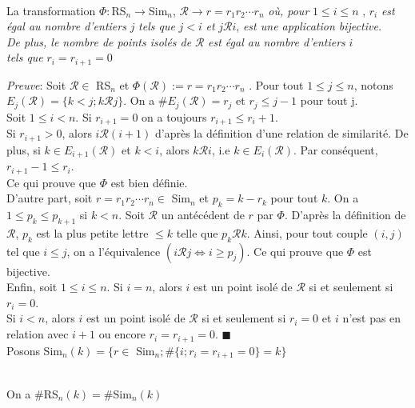\begin{proposition} \label{Phi_bijection} \text{ }\\
	La transformation $\Phi: $\rm{RS}$_{n} \rightarrow $\rm{Sim}$_{n}$, $\mathcal{R} \rightarrow r = r_{1}r_{2}\cdots r_{n}$ \textit{ où, pour }$1\leq i \leq n$ , $r_{i}$ \textit{est égal au nombre d'entiers} $j$ \textit{tels que} $j<i$ \textit{et} $j\mathcal{R}i$, \textit{est une application bijective.}\\ \textit{De plus, le nombre de points isolés de} $\mathcal{R}$ \textit{est égal au nombre d'entiers} $i$ \\\textit{tels que} $r_{i}=r_{i+1}=0$ %
\end{proposition}
\textit{Preuve}:
Soit $\mathcal{R} \in $\rm{ RS}$_{n}$ et $\Phi(\mathcal{R}):= r = r_{1}r_{2}\cdots r_{n}$ . Pour tout $1\leq j \leq n$, notons $E_{j}(\mathcal{R})=\{k<j; k \mathcal{R} j \}$. On a $\# E_{j}(\mathcal{R})=r_{j}$ et $r_{j}\leq j-1$ pour tout j.\\ Soit $1\leq i < n$. Si $r_{i+1}=0$ on a toujours $r_{i+1}\leq r_{i}+1$.\\
Si $r_{i+1}>0$, alors $i\mathcal{R}(i+1)$ d'après la définition d'une relation de similarité. De plus, si $k\in E_{i+1}(\mathcal{R})$ et $k<i$, alors $k\mathcal{R}i$, i.e $k\in E_{i}(\mathcal{R})$. Par conséquent, $r_{i+1}-1 \leq r_{i}$. \\Ce qui prouve que $\Phi$ est bien définie.\vspace{5pt}\\
D'autre part, soit $r=r_{1}r_{2}\cdots r_{n}\in $\rm{ Sim}$_{n}$ et $p_{k}=k-r_{k}$ pour tout $k$. On a $1\leq p_{k}\leq p_{k+1}$ si $k<n$.
Soit $\mathcal{R}$ un antécédent de $r$ par $\Phi$. D'après la définition de $\mathcal{R}$, $p_{k}$ est la plus petite lettre $\leq k$ telle que $p_{k}\mathcal{R}k$. Ainsi, pour tout couple $(i, j)$ tel que $i\leq j$, on a l'équivalence $(i\mathcal{R}j \iff i \geq p_{j})$. Ce qui prouve que $\Phi$ est bijective.\vspace{10pt}\\
Enfin, soit $1\leq i \leq n$. Si $i=n$, alors $i$ est un point isolé de $\mathcal{R}$ si et seulement si $r_{i}=0$.\\
Si $i<n$, alors $i$ est un point isolé de $\mathcal{R}$ si et seulement si $r_{i}=0$ et $i$ n'est pas en relation avec $i+1$ ou encore $r_{i}=r_{i+1}=0$. $\blacksquare$\\
Posons Sim$_{n}(k)=\{r \in $ Sim$_{n}; \#\{i; r_{i}=r_{i+1}=0\}=k\}$ 
\begin{corollaire} \label{sr_eq_sim} \text{ }\\
	On a $\#$\rm{RS}$_{n}(k) = \#$\rm{Sim}$_{n}(k)$
\end{corollaire}

